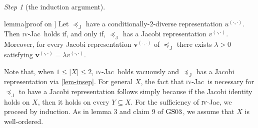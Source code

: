 \documentclass[ecta,nameyear,draft]{econsocart}
\newcommand{\mbbj}{\mathds J}
\newcommand{\dd}{{(\cdot,\cdot)}}
\newcommand{\fourjac}{\textup{\textsc{iv}-Jac}}
\newcommand{\gsii}{$\textup{GS03}$}
\theoremstyle{plain}
\theoremstyle{remark}
\newtheorem{step}{Step}[section]
\begin{document}
\begin{appendix}
\begin{step}[the induction argument]
    \begin{theoremEnd}{lemma}[proof on
      ]\label{lem-induction} Let
      $\preceq_{\mbbj}$ have a conditionally-$2$-diverse representation
      $u^{\dd}$. Then \fourjac\ holds if, and only if, $\preceq_{\mbbj}$ has a
      Jacobi representation $v^{\dd}$.  Moreover, for every Jacobi
      representation $\mathbf v^{\dd}$ of $\preceq_{\mbbj}$ there exists
      $\lambda > 0$ satisfying $\mathbf v^{(\cdot, \cdot)} = \lambda v^{(\cdot,
      \cdot)}$.
    \end{theoremEnd}

  \begin{proofEnd}\label{proof-lem-induction}%
    Note that, when $1 \leq \lvert X \rvert \leq 2$, \fourjac\ holds vacuously
    and $\preceq_{\mbbj}$ has a Jacobi representation via \cref{lem-insep}. For
    general $X$, the fact that \fourjac\ is necessary for $\preceq_{\mbbj}$ to
    have a Jacobi representation follows simply because if the Jacobi identity
    holds on $X$, then it holds on every $Y\subseteq X$. For the sufficiency of
    \fourjac, we proceed by induction.  As in lemma 3 and claim 9 of \gsii, we
    assume that $X$ is well-ordered.  
  

\end{proofEnd}
\end{step}
\end{appendix}
\end{document}
